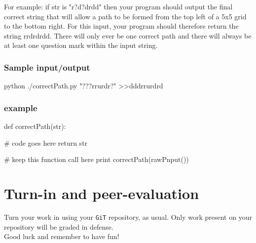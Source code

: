 \documentclass{42-en}
\begin{document}
    For example: if str is "r?d?drdd" then your program should output the 
    final correct string that will allow a path to be formed from the top 
    left of a 5x5 grid to the bottom right. For this input, your program 
    should therefore return the string rrdrdrdd. There will only ever be
    one correct path and there will always be at least one question mark 
    within the input string.

    \subsection{Sample input/output}

           \begin{42console}
            python ./correctPath.py "???rrurdr?"
            >>dddrrurdrd
            \end{42console}

    \subsection{example}

           \begin{42ccode}
                def correctPath(str): 

                    # code goes here 
                    return str
                    
                # keep this function call here  
                print correctPath(rawPnput()) 
            \end{42ccode}

\chapter{Turn-in and peer-evaluation}

    Turn your work in using your \texttt{GiT} repository, as
    usual. Only work present on your repository will be graded in defense.\\

    Good luck and remember to have fun!



\end{document}
